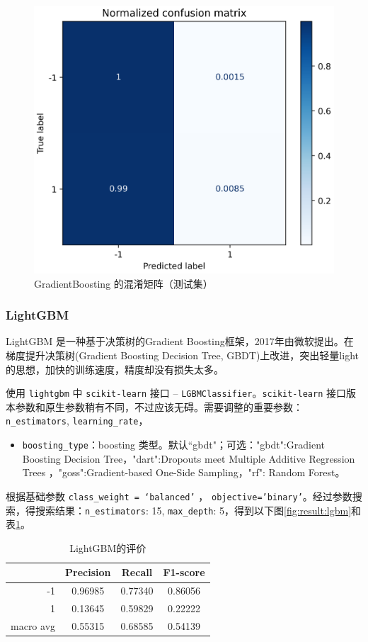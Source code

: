 \documentclass[a4paper]{article}
\begin{document}
\begin{figure}[!h]
    \centering
    \includegraphics[width=0.48\linewidth]{GradientBoosting_confus_mat-norm.png}
    \caption{GradientBoosting 的混淆矩阵（测试集）}
    \label{fig:result:grad}
\end{figure}

\subsubsection{LightGBM}
LightGBM 是一种基于决策树的Gradient Boosting框架\cite{ke2017lightgbm}，2017年由微软提出。在梯度提升决策树(Gradient Boosting Decision Tree, GBDT)上改进，突出轻量light的思想，加快的训练速度，精度却没有损失太多。

使用 \texttt{lightgbm} 中 \texttt{scikit-learn} 接口  -- \texttt{LGBMClassifier}。\texttt{scikit-learn} 接口版本参数和原生参数稍有不同，不过应该无碍。需要调整的重要参数：\texttt{n\_estimators}, \texttt{learning\_rate}，
\begin{itemize}
    \item \texttt{boosting\_type}：boosting 类型。默认``gbdt"；可选："gbdt":Gradient Boosting Decision Tree，"dart":Dropouts meet Multiple Additive Regression Trees ，"goss":Gradient-based One-Side Sampling，"rf": Random Forest。
\end{itemize}
根据基础参数 \texttt{class\_weight = `balanced'} ， \texttt{objective='binary'}。经过参数搜索，得搜索结果：\texttt{n\_estimators}: 15, \texttt{max\_depth}: 5，得到以下图\ref{fig:result:lgbm}和表\ref{tb:lgbm}。

\begin{table}[!h]
    \centering
    \renewcommand{\arraystretch}{1.5}
    \begin{tabular}{|r|c|c|c|}
        \hline
                  & Precision & Recall & F1-score \\ \hline
        -1        &     0.96985     &     0.77340   &    0.86056      \\ \hline
        1         &     0.13645      &     0.59829   &   0.22222       \\ \hline
        macro avg &      0.55315     &     0.68585   &    0.54139      \\ \hline
    \end{tabular}
    \caption{LightGBM的评价}
    \label{tb:lgbm}
\end{table}
\end{document}

